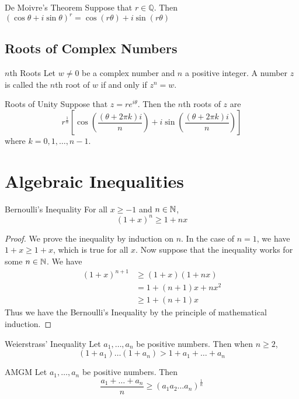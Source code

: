 \documentclass[a4paper]{article}
\begin{document}
\begin{thm}{De Moivre's Theorem}{} Suppose that $r\in\mathbb{Q}$. Then $(\cos{\theta}+i\sin{\theta})^r=\cos{(r\theta)}+i\sin{(r\theta)}$
\end{thm}

\subsection{Roots of Complex Numbers}
\begin{defn}{$n$th Roots}{} Let $w\neq0$ be a complex number and $n$ a positive integer. A number $z$ is called the $n$th root of $w$ if and only if $z^n=w$. 
\end{defn}

\begin{thm}{Roots of Unity}{} Suppose that $z=re^{i\theta}$. Then the $n$th roots of $z$ are $$r^{\frac{1}{n}}\left[\cos{\left(\frac{(\theta+2\pi k)i}{n}\right)}+i\sin{\left(\frac{(\theta+2\pi k)i}{n}\right)}\right]$$ where $k=0,1,\dots,n-1$. 
\end{thm}

\pagebreak
\section{Algebraic Inequalities}
\begin{thm}{Bernoulli's Inequality}{} For all $x\geq-1$ and $n\in\mathbb{N}$, $$(1+x)^n\geq1+nx$$\tcbline
\begin{proof} We prove the inequality by induction on $n$. In the case of $n=1$, we have $1+x\geq1+x$, which is true for all $x$. Now suppose that the inequality works for some $n\in\mathbb{N}$. We have 
\begin{align*}
(1+x)^{n+1}&\geq(1+x)(1+nx) \tag{Induction Hypothesis and $x\geq-1$} \\
&=1+(n+1)x+nx^2 \\
&\geq1+(n+1)x \tag{since $x^2\geq0$}
\end{align*}
Thus we have the Bernoulli's Inequality by the principle of mathematical induction. 
\end{proof}
\end{thm}

\begin{thm}{Weierstrass' Inequality}{} Let $a_1,\dots,a_n$ be positive numbers. Then when $n\geq2$, $$(1+a_1)\dots(1+a_n)>1+a_1+\dots+a_n$$
\end{thm}

\begin{thm}{AMGM}{} Let $a_1,\dots,a_n$ be positive numbers. Then $$\frac{a_1+\dots+a_n}{n}\geq(a_1a_2\dots a_n)^\frac{1}{n}$$
\end{thm}
\end{document}
